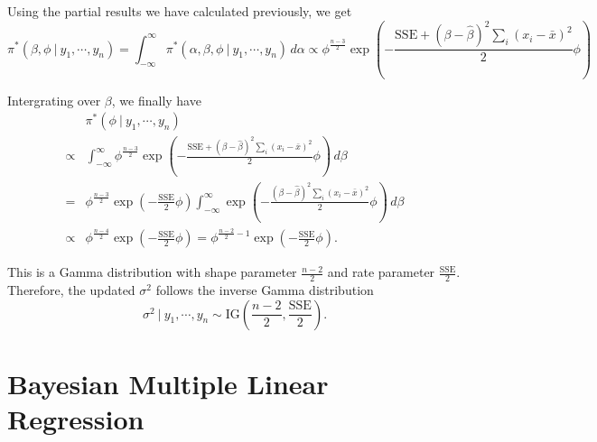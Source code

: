 \documentclass[]{book}
\theoremstyle{definition}
\theoremstyle{definition}
\theoremstyle{definition}
\theoremstyle{remark}
\begin{document}
Using the partial results we have calculated previously, we get \[
\pi^*(\beta, \phi~|~y_1,\cdots,y_n) = \int_{-\infty}^\infty \pi^*(\alpha, \beta, \phi~|~y_1,\cdots,y_n)\, d\alpha \propto \phi^{\frac{n-3}{2}}\exp\left(-\frac{\text{SSE}+(\beta-\hat{\beta})^2\sum_i (x_i-\bar{x})^2}{2}\phi\right) 
\]

Intergrating over \(\beta\), we finally have \[
\begin{aligned}
& \pi^*(\phi~|~y_1,\cdots,y_n) \\
\propto & \int_{-\infty}^\infty \phi^{\frac{n-3}{2}}\exp\left(-\frac{\text{SSE}+(\beta-\hat{\beta})^2\sum_i (x_i-\bar{x})^2}{2}\phi\right)\, d\beta\\
= & \phi^{\frac{n-3}{2}}\exp\left(-\frac{\text{SSE}}{2}\phi\right)\int_{-\infty}^\infty \exp\left(-\frac{(\beta-\hat{\beta})^2\sum_i(x_i-\bar{x})^2}{2}\phi\right)\, d\beta\\
\propto & \phi^{\frac{n-4}{2}}\exp\left(-\frac{\text{SSE}}{2}\phi\right) = \phi^{\frac{n-2}{2}-1}\exp\left(-\frac{\text{SSE}}{2}\phi\right).
\end{aligned}
\]

This is a Gamma distribution with shape parameter
\(\displaystyle \frac{n-2}{2}\) and rate parameter
\(\displaystyle \frac{\text{SSE}}{2}\). Therefore, the updated
\(\sigma^2\) follows the inverse Gamma distribution
\[ \sigma^2~|~y_1,\cdots,y_n \sim \text{IG}\left(\frac{n-2}{2}, \frac{\text{SSE}}{2}\right). \]

\section{Bayesian Multiple Linear
Regression}\label{bayesian-multiple-linear-regression}


\end{document}
